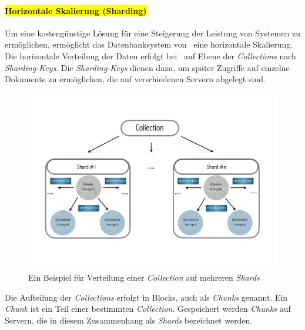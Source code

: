 \paragraph{\colorbox{yellow}{Horizontale Skalierung (Sharding)}}\label{sharding}

Um eine kostengünstige Lösung für eine Steigerung der Leistung von Systemen zu ermöglichen, ermöglicht das Datenbanksystem von \mongo\  eine horizontale Skalierung. Die horizontale Verteilung der Daten erfolgt bei \mongo\ auf Ebene der \textit{Collections} nach \textit{Sharding-Keys}. Die \textit{Sharding-Keys} dienen dazu, um später Zugriffe auf einzelne Dokumente zu ermöglichen, die auf verschiedenen Servern abgelegt sind.
\begin{figure}[H]
\centering
\includegraphics[trim = 0mm 35mm 0mm 30mm, clip, width=1.0\textwidth]{resources/replicaSet/sharding}
\caption[Ein Beispiel für Verteilung einer \textit{Collection} auf mehreren \textit{Shards}]{Ein Beispiel für Verteilung einer \textit{Collection} auf mehreren \textit{Shards}}
\label{img:sharding}
\end{figure}
Die Aufteilung der \textit{Collections} erfolgt in Blocks, auch als \textit{Chunks} genannt. Ein \textit{Chunk} ist ein Teil einer bestimmten \textit{Collection}. Gespeichert werden \textit{Chunks} auf Servern, die in diesem Zusammenhang als \textit{Shards} bezeichnet werden.

